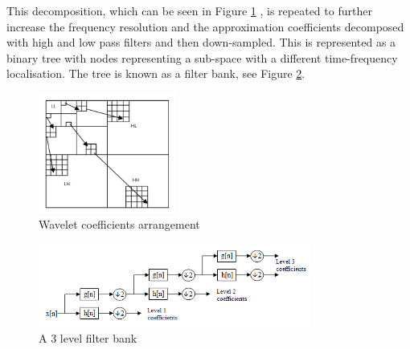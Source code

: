 This decomposition, which can be seen in Figure \ref{fig:wavelets_decomposition} \cite{cui2015application}, is repeated to further increase the frequency resolution and the approximation coefficients decomposed with high and low pass filters and then down-sampled. This is represented as a binary tree with nodes representing a sub-space with a different time-frequency localisation. The tree is known as a filter bank, see Figure \ref{fig:wavelets_bank}.


\begin{figure}
	\centering
	\includegraphics[width=0.4\textwidth]{fig/wavelets_decomposition}
	\caption{Wavelet coefficients arrangement}
	\label{fig:wavelets_decomposition}
\end{figure}

\begin{figure}
	\centering
	\includegraphics[width=0.8\textwidth]{fig/wavelets_bank}
	\caption{A 3 level filter bank}
	\label{fig:wavelets_bank}
\end{figure}